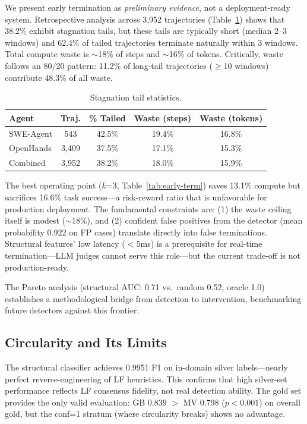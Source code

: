 \documentclass[11pt,a4paper]{article}
\begin{document}
We present early termination as \emph{preliminary evidence}, not a deployment-ready system.
Retrospective analysis across 3{,}952 trajectories (Table~\ref{tab:waste}) shows that 38.2\% exhibit stagnation tails, but these tails are typically short (median 2--3 windows) and 62.4\% of tailed trajectories terminate naturally within 3 windows.
Total compute waste is $\sim$18\% of steps and $\sim$16\% of tokens.
Critically, waste follows an 80/20 pattern: 11.2\% of long-tail trajectories ($\geq$10 windows) contribute 48.3\% of all waste.

\begin{table}[t]
\centering
\small
\begin{tabular}{lcccc}
\toprule
\textbf{Agent} & \textbf{Traj.} & \textbf{\% Tailed} & \textbf{Waste (steps)} & \textbf{Waste (tokens)} \\
\midrule
SWE-Agent & 543 & 42.5\% & 19.4\% & 16.8\% \\
OpenHands & 3{,}409 & 37.5\% & 17.1\% & 15.3\% \\
Combined & 3{,}952 & 38.2\% & 18.0\% & 15.9\% \\
\bottomrule
\end{tabular}
\caption{Stagnation tail statistics.}
\label{tab:waste}
\end{table}

The best operating point ($k$=3, Table~\ref{tab:early-term}) saves 13.1\% compute but sacrifices 16.6\% task success---a risk-reward ratio that is unfavorable for production deployment.
The fundamental constraints are: (1) the waste ceiling itself is modest ($\sim$18\%), and (2) confident false positives from the detector (mean probability 0.922 on FP cases) translate directly into false terminations.
Structural features' low latency ($<$5ms) is a prerequisite for real-time termination---LLM judges cannot serve this role---but the current trade-off is not production-ready.

The Pareto analysis (structural AUC: 0.71 vs.\ random 0.52, oracle 1.0) establishes a methodological bridge from detection to intervention, benchmarking future detectors against this frontier.

\subsection{Circularity and Its Limits}

The structural classifier achieves 0.9951 F1 on in-domain silver labels---nearly perfect reverse-engineering of LF heuristics.
This confirms that high silver-set performance reflects LF consensus fidelity, not real detection ability.
The gold set provides the only valid evaluation: GB 0.839 $>$ MV 0.798 ($p<0.001$) on overall gold, but the conf=1 stratum (where circularity breaks) shows no advantage.
\end{document}

